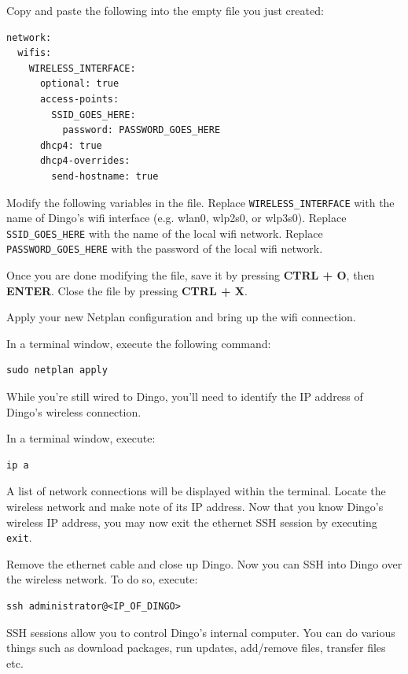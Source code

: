 \documentclass[]{clearpath-latex/clearpath-manual}
\begin{document}
Copy and paste the following into the empty file you just created:

\begin{lstlisting}
network:
  wifis:
    WIRELESS_INTERFACE:
      optional: true
      access-points:
        SSID_GOES_HERE:
          password: PASSWORD_GOES_HERE
      dhcp4: true
      dhcp4-overrides:
        send-hostname: true
\end{lstlisting}

Modify the following variables in the file. Replace \lstinline{WIRELESS_INTERFACE} with the name of Dingo's wifi interface (e.g. wlan0, wlp2s0, or wlp3s0). Replace \lstinline{SSID_GOES_HERE} with the name of the local wifi network. Replace \lstinline{PASSWORD_GOES_HERE} with the password of the local wifi network. 

Once you are done modifying the file, save it by pressing \textbf{CTRL + O}, then \textbf{ENTER}. Close the file by pressing \textbf{CTRL + X}.

Apply your new Netplan configuration and bring up the wifi connection.

In a terminal window, execute the following command:

\begin{lstlisting}
sudo netplan apply
\end{lstlisting}

While you're still wired to Dingo, you'll need to identify the IP address of Dingo's wireless connection.

In a terminal window, execute:

\begin{lstlisting}
ip a
\end{lstlisting}

A list of network connections will be displayed within the terminal.  Locate the wireless network and make note of its IP address. Now that you know Dingo's wireless IP address, you may now exit the ethernet SSH session by executing \lstinline{exit}.

Remove the ethernet cable and close up Dingo.   Now you can SSH into Dingo over the wireless network.  To do so, execute:

\begin{lstlisting}
ssh administrator@<IP_OF_DINGO>
\end{lstlisting}

SSH sessions allow you to control Dingo's internal computer.  You can do various things such as download packages, run updates, add/remove files, transfer files etc.
\end{document}
